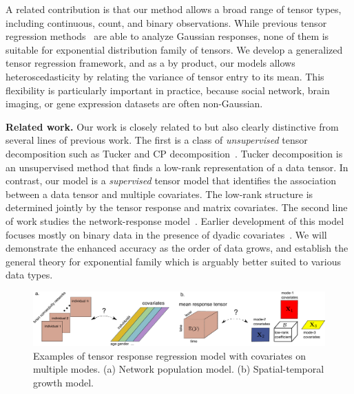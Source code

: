 \documentclass{article}
\theoremstyle{plain}
\theoremstyle{definition}
\begin{document}
A related contribution is that our method allows a broad range of tensor types, including continuous, count, and binary observations. While previous tensor regression methods~\cite{zhao2012higher,yu2016learning} are able to analyze Gaussian responses, none of them is suitable for exponential distribution family of tensors. We develop a generalized tensor regression framework, and as a by product, our models allows heteroscedasticity by relating the variance of tensor entry to its mean.  This flexibility is particularly important in practice, because social network, brain imaging, or gene expression datasets are often non-Gaussian.


{\bf Related work.} Our work is closely related to but also clearly distinctive from several lines of previous work. The first is a class of \emph{unsupervised} tensor decomposition such as Tucker and CP decomposition~\cite{de2000multilinear,hong2018generalized,zhang2018tensor}. Tucker decomposition is an unsupervised method that finds a low-rank representation of a data tensor. In contrast, our model is a {\it supervised} tensor model that identifies the association between a data tensor and multiple covariates. The low-rank structure is determined jointly by the tensor response and matrix covariates. The second line of work studies the network-response model~\cite{rabusseau2016low, li2017parsimonious}. Earlier development of this model focuses mostly on binary data in the presence of dyadic covariates~\cite{hoff2005bilinear}. We will demonstrate the enhanced accuracy as the order of data grows, and establish the general theory for exponential family which is arguably better suited to various data types. 

\begin{figure}[t]
\begin{center}
\includegraphics[width=12cm]{demo.pdf}
\end{center}
\caption{Examples of tensor response regression model with covariates on multiple modes. (a) Network population model. (b) Spatial-temporal growth model. }\label{fig:intro1}
\vspace{-.4cm}
\end{figure}
\end{document}
